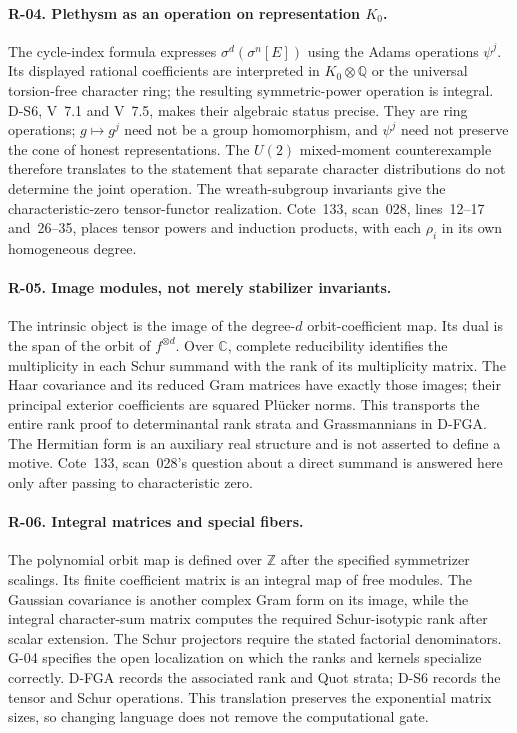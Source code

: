 \paragraph{R-04. Plethysm as an operation on representation $K_0$.}
The cycle-index formula expresses $\sigma^d(\sigma^n[E])$ using the Adams operations $\psi^j$. Its displayed rational coefficients are interpreted in $K_0\otimes\mathbb Q$ or the universal torsion-free character ring; the resulting symmetric-power operation is integral. D-S6, V~7.1 and V~7.5, makes their algebraic status precise. They are ring operations; $g\mapsto g^j$ need not be a group homomorphism, and $\psi^j$ need not preserve the cone of honest representations. The $U(2)$ mixed-moment counterexample therefore translates to the statement that separate character distributions do not determine the joint operation. The wreath-subgroup invariants give the characteristic-zero tensor-functor realization. Cote~133, scan~028, lines~12--17 and~26--35, places tensor powers and induction products, with each $\rho_i$ in its own homogeneous degree.

\paragraph{R-05. Image modules, not merely stabilizer invariants.}
The intrinsic object is the image of the degree-$d$ orbit-coefficient map. Its dual is the span of the orbit of $f^{\otimes d}$. Over $\mathbb C$, complete reducibility identifies the multiplicity in each Schur summand with the rank of its multiplicity matrix. The Haar covariance and its reduced Gram matrices have exactly those images; their principal exterior coefficients are squared Pl\"ucker norms. This transports the entire rank proof to determinantal rank strata and Grassmannians in D-FGA. The Hermitian form is an auxiliary real structure and is not asserted to define a motive. Cote~133, scan~028's question about a direct summand is answered here only after passing to characteristic zero.

\paragraph{R-06. Integral matrices and special fibers.}
The polynomial orbit map is defined over $\mathbb Z$ after the specified symmetrizer scalings. Its finite coefficient matrix is an integral map of free modules. The Gaussian covariance is another complex Gram form on its image, while the integral character-sum matrix computes the required Schur-isotypic rank after scalar extension. The Schur projectors require the stated factorial denominators. G-04 specifies the open localization on which the ranks and kernels specialize correctly. D-FGA records the associated rank and Quot strata; D-S6 records the tensor and Schur operations. This translation preserves the exponential matrix sizes, so changing language does not remove the computational gate.

